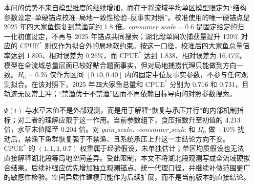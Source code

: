 本问的优势不来自模型维度的继续增加，而在于将流域平均单区模型限定为“结构参数设定--单硬锚点校准--局地一致性检验--反事实对照”。校准使用的唯一硬锚点是 2025 年四大家鱼恢复到禁渔前约 1.8 倍。\(consumer\_scale=0.6\) 是固定给定的归一化初值设定，不再与 2025 年锚点共同搜索；湖北段单网次捕获量提升 120\% 对应的 \(\mathrm{CPUE}^*\) 则仅作为拟合外的局地软约束。按这一口径，校准后四大家鱼总量倍率达到 1.805、相对误差为 0.26\%，而 \(\mathrm{CPUE}^*\) 达到 1.838、相对误差为 16.47\%。模型在全流域总量层面已较好贴合题面事实，但对局地捕捞代理只能做到方向一致。\(H_0=0.25\) 仅作为区间 \([0.10,0.40]\) 内的固定中位反事实参数，不参与任何观测拟合。在该对照下，2025 年四大家鱼总量和 \(\mathrm{CPUE}^*\) 分别为 0.716 和 0.731，且轨迹无反常上冲；“禁渔优于不禁渔”因而不再依赖目标导向的对照参数搜索。

\(\Phi(t)\) 与水草末值不是外部观测，而是用于解释“恢复与承压并行”的内部机制指标；对二者的理解应限于这一作用。当前参数组下，食压指数升至初值的 4.213 倍，水草末值降至 0.204 倍。对 \(gain\_scale\)、\(consumer\_scale\) 和 \(H_0\) 做 \(\pm10\%\) 扰动后，禁渔下鱼群恢复强于不禁渔、且系统承压上升这一主结论方向不变。\(\mathrm{CPUE}^*\) 的 \((1,1,1,0.7)\) 权重属于经验假设，未单独估计；单区均质假设也无法直接解释湖北段等局地空间差异。受此限制，本文不将湖北段观测写成全流域硬拟合结果。后续补强应优先增加独立观测锚点、统一代理口径，并继续补做范围更广的敏感性检验。空间异质性建模只能作为后续扩展，而不是当前版本的直接结论。
